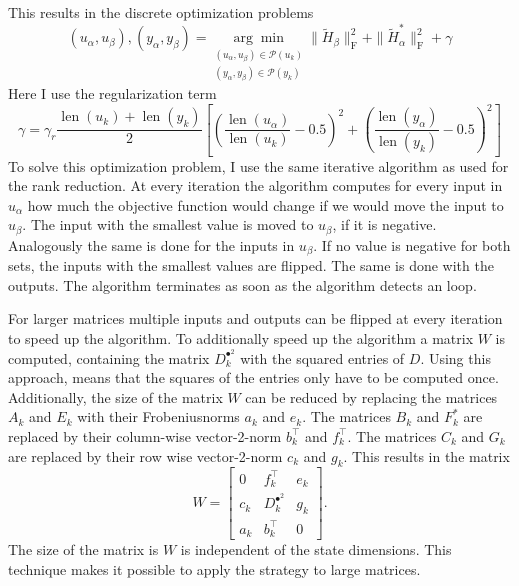 \documentclass[doctype=mastersthesis,BCOR=15mm,biblatex]{ldvbook}%
\DeclareMathOperator{\length}{len}
\newcommand{\partition}{\mathcal{P}}
\begin{document}
This results in the discrete optimization problems
\begin{equation}
(u_\alpha,u_\beta),(y_\alpha,y_\beta) = \underset{\substack{(u_\alpha, u_\beta) \in \partition(u_k)\\(y_\alpha, y_\beta) \in \partition(y_k)
}}{\arg\min} \|\tilde{H}_\beta\|_\text{F}^2 + \|\tilde{H}_\alpha^*\|_\text{F}^2 +\gamma
\end{equation}
Here I use the regularization term
\begin{equation}
\gamma =\gamma_r \frac{\length(u_k)+\length(y_k)}{2}%
\left[ \left(\frac{\length(u_\alpha)}{\length(u_k)}-0.5\right)^2
+
\left(\frac{\length(y_\alpha)}{\length(y_k)}-0.5\right)^2
\right]
\end{equation}
To solve this optimization problem, I use the same iterative algorithm as used for the rank reduction.
At every iteration the algorithm computes for every input in $u_\alpha$ how much the objective function would change if we would move the input to $u_\beta$.
The input with the smallest value is moved to $u_\beta$, if it is negative.
Analogously the same is done for the inputs in $u_\beta$.
If no value is negative for both sets, the inputs with the smallest values are flipped.
The same is done with the outputs.
The algorithm terminates as soon as the algorithm detects an loop.


For larger matrices multiple inputs and outputs can be flipped at every iteration to speed up the algorithm.
To additionally speed up the algorithm a matrix $W$ is computed, containing the matrix $D_k^{\bullet^2}$ with the squared entries of $D$.
Using this approach, means that the squares of the entries only have to be computed once.
Additionally, the size of the matrix $W$ can be reduced by replacing the matrices $A_k$ and $E_k$ with their Frobeniusnorms $a_k$ and $e_k$.
The matrices $B_k$ and $F_k^*$ are replaced by their column-wise vector-2-norm $b_k^\top$ and $f_k^\top$.
The matrices $C_k$ and $G_k$ are replaced by their row wise vector-2-norm $c_k$ and $g_k$.
This results in the matrix
\begin{equation}
W = 
\begin{bmatrix}
0   &f_k^\top & e_k\\
c_k & D_k^{\bullet^2} & g_k\\
a_k & b_k^\top & 0
\end{bmatrix}
.
\end{equation}
The size of the matrix is $W$ is independent of the state dimensions.
This technique makes it possible to apply the strategy to large matrices.
\end{document}
